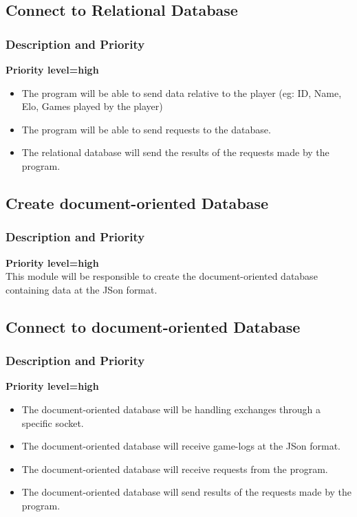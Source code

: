 \documentclass{scrreprt}
\begin{document}
\subsection{Connect to Relational Database}
\subsubsection{Description and Priority}
\textbf{Priority level=high}\\
\begin{itemize}
\item The program will be able to send data relative to the player (eg: ID, Name, Elo, Games played by the player)
\item The program will be able to send requests to the database.
\item The relational database will send the results of the requests made by the program.
\end{itemize}


\subsection{Create document-oriented Database}

\subsubsection{Description and Priority}
\textbf{Priority level=high}\\
This module will be responsible to create the document-oriented database containing data at the JSon format.

\subsection{Connect to document-oriented Database}
\subsubsection{Description and Priority}
\textbf{Priority level=high}\\
\begin{itemize}
\item The document-oriented database will be handling exchanges through a specific socket.
\item The document-oriented database will receive game-logs at the JSon format.
\item The document-oriented database will receive requests from the program.
\item The document-oriented database will send results of the requests made by the program.
\end{itemize}
\end{document}
